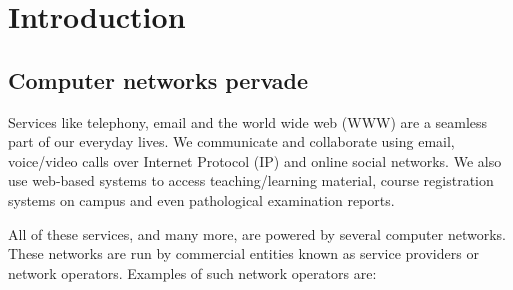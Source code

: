 \chapter{Introduction}
\label{chap:intro}

\section{Computer networks pervade}
Services like telephony, email and the world wide web (WWW) are a seamless part of our everyday lives. We communicate and collaborate using email, voice/video calls over Internet Protocol (IP) and online social networks. We also use web-based systems to access teaching/learning material, course registration systems on campus and even pathological examination reports. 

All of these services, and many more, are powered by several computer networks. These networks are run by commercial entities known as service providers or network operators. Examples of such network operators are: 

